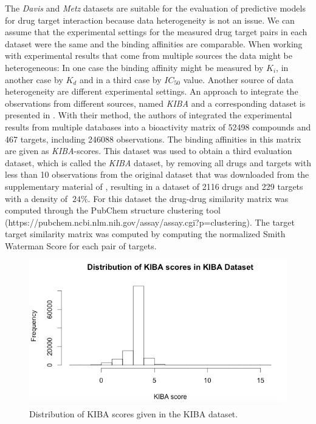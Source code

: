 The \textit{Davis} and \textit{Metz} datasets are suitable for the evaluation of predictive models for drug target interaction because data heterogeneity is not an issue. We can assume that the experimental settings for the measured drug target pairs in each dataset were the same and the binding affinities are comparable. When working with experimental results that come from multiple sources the data might be heterogeneous: In one case the binding affinity might be measured by $K_i$, in another case by $K_d$ and in a third case by $IC_{50}$ value. Another source of data heterogeneity are different experimental settings. An approach to integrate the observations from different sources, named \textit{KIBA} and a corresponding dataset is presented in \cite{tang2014making}. With their method, the authors of \cite{tang2014making} integrated the experimental results from multiple databases into a bioactivity matrix of 52498 compounds and 467 targets, including 246088 observations. The binding affinities in this matrix are given as \textit{KIBA}-scores. This dataset was used to obtain a third evaluation dataset, which is called the \textit{KIBA} dataset, by removing all drugs and targets with less than 10 observations from the original dataset that was downloaded from the supplementary material of \cite{tang2014making}, resulting in a dataset of 2116 drugs and 229 targets with a density of $~24\%$. For this dataset the drug-drug similarity matrix was computed through the PubChem structure clustering tool (https://pubchem.ncbi.nlm.nih.gov/assay/assay.cgi?p=clustering). The target target similarity matrix was computed by computing the normalized Smith Waterman Score \cite{yamanishi2010drug} for each pair of targets.

\begin{figure}
\begin{center}
\includegraphics[scale=0.6]{kiba_dist.png}
\end{center}
\caption{Distribution of KIBA scores given in the KIBA dataset.}
\label{fig:numStructure}
\end{figure}
